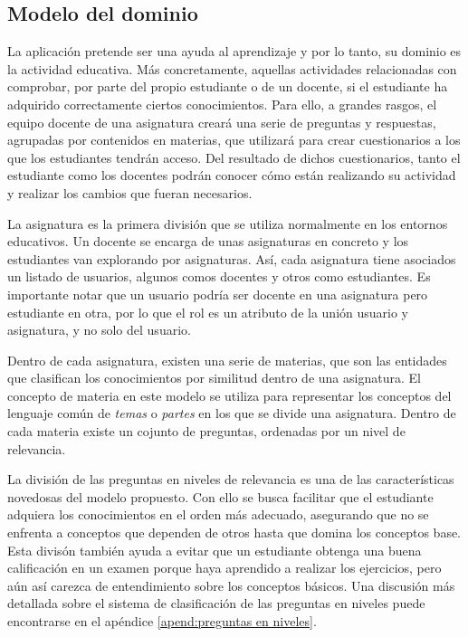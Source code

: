 \subsection{Modelo del dominio}

La aplicación pretende ser una ayuda al aprendizaje y por lo tanto, su dominio es la actividad educativa. Más concretamente, aquellas actividades relacionadas con comprobar, por parte del propio estudiante o de un docente, si el estudiante ha adquirido correctamente ciertos conocimientos. Para ello, a grandes rasgos, el equipo docente de una asignatura creará una serie de preguntas y respuestas, agrupadas por contenidos en materias, que utilizará para crear cuestionarios a los que los estudiantes tendrán acceso. Del resultado de dichos cuestionarios, tanto el estudiante como los docentes podrán conocer cómo están realizando su actividad y realizar los cambios que fueran necesarios.

La asignatura es la primera división que se utiliza normalmente en los entornos educativos. Un docente se encarga de unas asignaturas en concreto y los estudiantes van explorando por asignaturas. Así, cada asignatura tiene asociados un listado de usuarios, algunos comos docentes y otros como estudiantes. Es importante notar que un usuario podría ser docente en una asignatura pero estudiante en otra, por lo que el rol es un atributo de la unión usuario y asignatura, y no solo del usuario.

Dentro de cada asignatura, existen una serie de materias, que son las entidades que clasifican los conocimientos por similitud dentro de una asignatura. El concepto de materia en este modelo se utiliza para representar los conceptos del lenguaje común de \emph{temas} o \emph{partes} en los que se divide una asignatura. Dentro de cada materia existe un cojunto de preguntas, ordenadas por un nivel de relevancia.

La división de las preguntas en niveles de relevancia es una de las características novedosas del modelo propuesto. Con ello se busca facilitar que el estudiante adquiera los conocimientos en el orden más adecuado, asegurando que no se enfrenta a conceptos que dependen de otros hasta que domina los conceptos base. Esta divisón también ayuda a evitar que un estudiante obtenga una buena calificación en un examen porque haya aprendido a realizar los ejercicios, pero aún así carezca de entendimiento sobre los conceptos básicos. Una discusión más detallada sobre el sistema de clasificación de las preguntas en niveles puede encontrarse en el apéndice \ref{apend:preguntas en niveles}.

